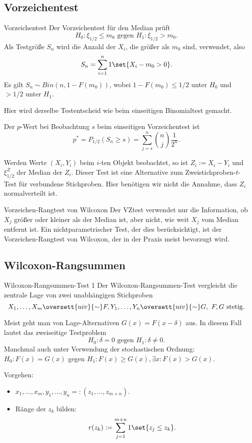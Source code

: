 \subsection{Vorzeichentest}

\begin{karte}{Vorzeichentest}
Der Vorzeichentest für den Median prüft 
\[ H_0: \xi_{1/2} \leq m_0 \text{ gegen } H_1: \xi_{1/2} > m_0. \]
Als Testgröße \(S_n\) wird die Anzahl der \(X_i\), die größer als \(m_0\) sind, 
verwendet, also 
\[ S_n = \sum_{i=1}^n 1 \set{X_i - m_0 > 0}. \]
Es gilt 
\(S_n \sim Bin(n, 1-F(m_0))\), wobei \(1-F(m_0) \leq 1/2\) unter \(H_0\) 
und \(> 1/2\) unter \(H_1\).

Hier wird derselbe Testentscheid wie beim einseitigen Binomialtest gemacht. 

Der \(p\)-Wert bei Beobachtung \(s\) beim einseitigen Vorzeichentest ist 
\[ p^* = P_{1/2}(S_n \geq s) = \sum_{j=s}^n \binom{n}{j} \frac{1}{2^n}. \]

Werden Werte \((X_i, Y_i)\) beim \(i\)-ten Objekt beobachtet, so ist 
\(Z_i := X_i - Y_i\) und \(\xi_{1/2}^Z\) der Median der \(Z_i\). Dieser Test ist 
eine Alternative zum Zweistichproben-\(t\)-Test für verbundene Stichproben. Hier 
benötigen wir nicht die Annahme, dass \(Z_i\) normalverteilt ist.
\end{karte}

\begin{karte}{Vorzeichen-Rangtest von Wilcoxon}
Der VZtest verwendet nur die Information, ob \(X_j\) größer oder kleiner 
als der Median ist, aber nicht, wie weit \(X_j\) vom Median entfernt ist. 
Ein nichtparametrischer Test, der dies berücksichtigt, ist der Vorzeichen-Rangtest 
von Wilcoxon, der in der Praxis meist bevorzugt wird.
\end{karte}

\subsection{Wilcoxon-Rangsummen}

\begin{karte}{Wilcoxon-Rangsummen-Test 1}
Der Wilcoxon-Rangsummen-Test vergleicht die zentrale Lage 
von zwei unabhängigen Stichproben 
\[ X_1, \ldots, X_m \oversett{uiv}{\sim} F, Y_1, \ldots, Y_n \oversett{uiv}{\sim} G,\ F,G\text{ stetig.} \]

Meist geht man von Lage-Alternativen \(G(x) = F(x-\delta)\) aus. In diesem Fall 
lautet das zweiseitige Testproblem 
\[ H_0 : \delta = 0 \text{ gegen } H_1: \delta \neq 0. \]
Manchmal auch unter Verwendung der stochastischen Ordnung: \(H_0: F(x) = G(x)\) gegen \(H_1: F(x) \geq G(x), \exists x: F(x) > G(x)\).

Vorgehen: 
\begin{itemize}
    \item \(x_1, \ldots, x_m, y_1, \ldots, y_n =: (z_1, \ldots, z_{m+n})\).
    \item Ränge der \(z_k\) bilden: 
    \[ r(z_k) := \sum_{j=1}^{m+n} 1\set{z_j \leq z_k}. \]
\end{itemize}
\end{karte}

